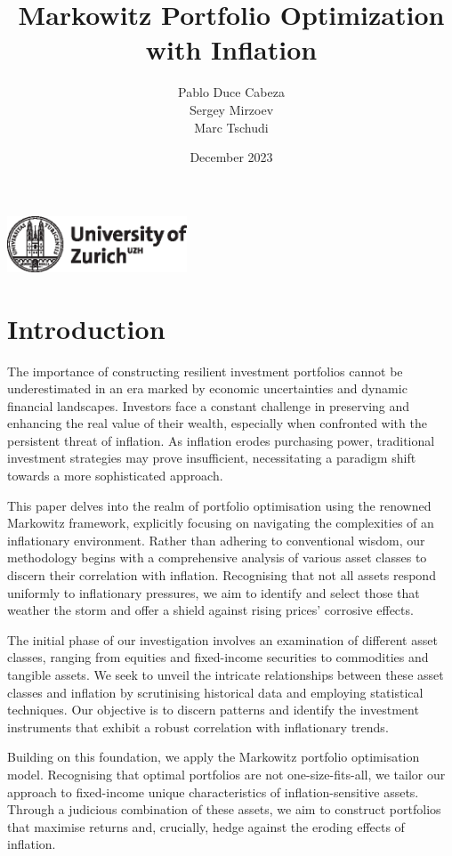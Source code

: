\documentclass{article}
\title{Markowitz Portfolio Optimization with Inflation}
\author{Pablo Duce Cabeza \\ Sergey Mirzoev \\ Marc Tschudi}
\date{December 2023}
\makeatletter
\renewcommand{\maketitle}{
    \begin{titlepage}
        \vspace*{\stretch{1}}
        \begin{center}
            \Large\textbf{\@title}
        \end{center}
        \vspace{\stretch{2}}
        \begin{center}
            \large\@author
        \end{center}
        \vspace{\stretch{3}}
        \begin{center}
            \large\@date
        \end{center}
        \vspace{\stretch{0.5}}
        \begin{center}
            \includegraphics[width=0.4\textwidth]{figure/uzh_logo_e_pos.eps}
        \end{center}
    \end{titlepage}
}
\makeatother
\begin{document}
\maketitle

\newpage
\tableofcontents
\newpage
\listoffigures
\listoftables
\newpage

\section{Introduction}

The importance of constructing resilient investment portfolios cannot be underestimated in an era marked by economic uncertainties and dynamic financial landscapes. Investors face a constant challenge in preserving and enhancing the real value of their wealth, especially when confronted with the persistent threat of inflation. As inflation erodes purchasing power, traditional investment strategies may prove insufficient, necessitating a paradigm shift towards a more sophisticated approach.

This paper delves into the realm of portfolio optimisation using the renowned Markowitz framework, explicitly focusing on navigating the complexities of an inflationary environment. Rather than adhering to conventional wisdom, our methodology begins with a comprehensive analysis of various asset classes to discern their correlation with inflation. Recognising that not all assets respond uniformly to inflationary pressures, we aim to identify and select those that weather the storm and offer a shield against rising prices' corrosive effects.

The initial phase of our investigation involves an examination of different asset classes, ranging from equities and fixed-income securities to commodities and tangible assets. We seek to unveil the intricate relationships between these asset classes and inflation by scrutinising historical data and employing statistical techniques. Our objective is to discern patterns and identify the investment instruments that exhibit a robust correlation with inflationary trends.

Building on this foundation, we apply the Markowitz portfolio optimisation model. Recognising that optimal portfolios are not one-size-fits-all, we tailor our approach to fixed-income unique characteristics of inflation-sensitive assets. Through a judicious combination of these assets, we aim to construct portfolios that maximise returns and, crucially, hedge against the eroding effects of inflation.
\end{document}
